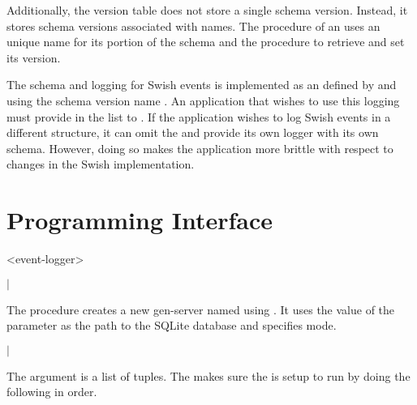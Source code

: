 Additionally, the version table does not store a single schema
version. Instead, it stores schema versions associated with names. The
 procedure of an  uses an unique
name for its portion of the schema and the 
procedure to retrieve and set its version.

The schema and logging for Swish events is implemented as an
 defined by  and
using the schema version name . An application that
wishes to use this logging must provide  in
the list to . If the application wishes to log
Swish events in a different structure, it can omit the
 and provide its own logger with its own
schema. However, doing so makes the application more brittle with
respect to changes in the Swish implementation.

\section {Programming Interface}

\begin{tupledef}{<event-logger>}
\end{tupledef}

\begin{procedure}
\end{procedure}
\returns{}
 $|$

The  procedure creates a new 
gen-server named  using . It
uses the value of the  parameter as the path to the
SQLite database and specifies  mode.

\begin{procedure}
\end{procedure}
\returns{}
 $|$

The argument  is a list of 
tuples. The  makes sure the  is
setup to run by doing the following in order.

